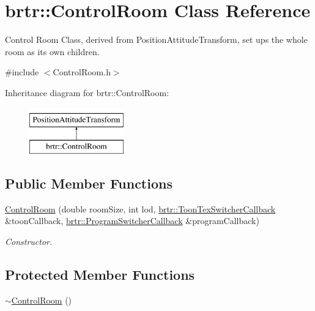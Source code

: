 \hypertarget{classbrtr_1_1_control_room}{\section{brtr\+:\+:Control\+Room Class Reference}
\label{classbrtr_1_1_control_room}
}


Control Room Class, derived from Position\+Attitude\+Transform, set ups the whole room as its own children.  




{\ttfamily \#include $<$Control\+Room.\+h$>$}

Inheritance diagram for brtr\+:\+:Control\+Room\+:\begin{figure}[H]
\begin{center}
\leavevmode
\includegraphics[height=2.000000cm]{classbrtr_1_1_control_room}
\end{center}
\end{figure}
\subsection*{Public Member Functions}
\begin{DoxyCompactItemize}
\item 
\hyperlink{classbrtr_1_1_control_room_afb36cd27e18234098fbecd22ac325319}{Control\+Room} (double room\+Size, int lod, \hyperlink{classbrtr_1_1_toon_tex_switcher_callback}{brtr\+::\+Toon\+Tex\+Switcher\+Callback} \&toon\+Callback, \hyperlink{classbrtr_1_1_program_switcher_callback}{brtr\+::\+Program\+Switcher\+Callback} \&program\+Callback)
\begin{DoxyCompactList}\small\item\em Constructor. \end{DoxyCompactList}\end{DoxyCompactItemize}
\subsection*{Protected Member Functions}
\begin{DoxyCompactItemize}
\item 
\hyperlink{classbrtr_1_1_control_room_a97b0eb95277b12a2267f8e7c777aeda2}{$\sim$\+Control\+Room} ()
\end{DoxyCompactItemize}
